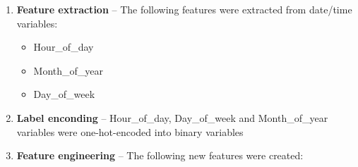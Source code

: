 \documentclass[mstat,12pt]{unswthesis}
\begin{document}
\begin{enumerate}
\def\labelenumi{\arabic{enumi}.}
\item
  \textbf{Feature extraction} -- The following features were extracted from date/time variables:

  \begin{itemize}
  \tightlist
  \item
    Hour\_of\_day
  \item
    Month\_of\_year
  \item
    Day\_of\_week
  \end{itemize}
\item
  \textbf{Label enconding} -- Hour\_of\_day, Day\_of\_week and Month\_of\_year variables were one-hot-encoded into binary variables
\item
  \textbf{Feature engineering} -- The following new features were created:


\end{enumerate}
\end{document}

